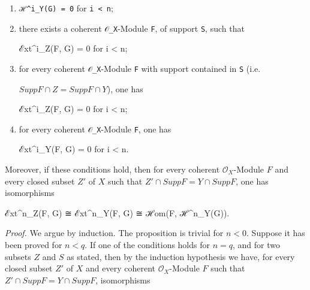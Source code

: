\documentclass[
]{article}
\newenvironment{Shaded}{}{}
\newcommand{\NormalTok}[1]{#1}
\begin{document}
\begin{enumerate}
\def\labelenumi{\arabic{enumi}.}
\item
  \texttt{ℋ\^{}i\_Y(G)\ =\ 0} for \texttt{i\ \textless{}\ n};
\item
  there exists a coherent \texttt{𝒪\_X}-Module \texttt{F}, of support
  \texttt{S}, such that

\begin{Shaded}
\begin{Highlighting}[]
\NormalTok{ℰxt\^{}i\_Z(F, G) = 0 for i \textless{} n;}
\end{Highlighting}
\end{Shaded}
\item
  for every coherent \texttt{𝒪\_X}-Module \texttt{F} with support
  contained in \texttt{S} (i.e.

  \(Supp F \cap Z = Supp F \cap Y\)), one has

\begin{Shaded}
\begin{Highlighting}[]
\NormalTok{ℰxt\^{}i\_Z(F, G) = 0 for i \textless{} n;}
\end{Highlighting}
\end{Shaded}
\item
  for every coherent \texttt{𝒪\_X}-Module \texttt{F}, one has

\begin{Shaded}
\begin{Highlighting}[]
\NormalTok{ℰxt\^{}i\_Y(F, G) = 0 for i \textless{} n.}
\end{Highlighting}
\end{Shaded}
\end{enumerate}

Moreover, if these conditions hold, then for every coherent
\(\mathcal{O}_{X}\)-Module \(F\) and every closed subset \(Z'\) of \(X\)
such that \(Z' \cap Supp F = Y \cap Supp F\), one has isomorphisms

\begin{Shaded}
\begin{Highlighting}[]
\NormalTok{ℰxt\^{}n\_Z(F, G) ≅ ℰxt\^{}n\_Y(F, G) ≅ ℋom(F, ℋ\^{}n\_Y(G)).}
\end{Highlighting}
\end{Shaded}

\emph{Proof.} We argue by induction. The proposition is trivial for
\(n < 0\). Suppose it has been proved for \(n < q\). If one of the
conditions holds for \(n = q\), and for two subsets \(Z\) and \(S\) as
stated, then by the induction hypothesis we have, for every closed
subset \(Z'\) of \(X\) and every coherent \(\mathcal{O}_{X}\)-Module
\(F\) such that \(Z' \cap Supp F = Y \cap Supp F\), isomorphisms
\end{document}

